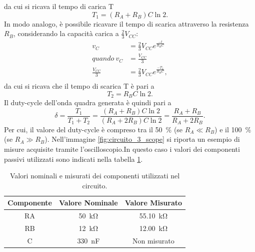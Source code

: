 da cui si ricava il tempo di carica T
\begin{equation}
	T_{1}=(R_A+R_B)C\ln{2}.
\end{equation}
In modo analogo, è possibile ricavare il tempo di scarica attraverso la resistenza $R_B$, considerando la capacità carica a $\frac{2}{3}V_{CC}$:
\begin{equation}
	\begin{split}
		v_C&=\frac{2}{3}V_{CC}e^{\frac{-t}{R_BC}} \\
		quando \ v_C&=\frac{V_{CC}}{3} \\
		\frac{V_{CC}}{3}&=\frac{2}{3}V_{CC}e^{\frac{-T_2}{R_BC}}, \\
	\end{split}
\end{equation}
da cui si ricava che il tempo di scarica T è pari a
\begin{equation}
	T_2=R_B C \ln{2}.
\end{equation}
Il duty-cycle dell'onda quadra generata è quindi pari a 
\begin{equation}
	\delta=\frac{T_1}{T_1+T_2}=\frac{(R_A+R_B)C\ln{2}}{(R_A+2R_B)C\ln{2}}=\frac{R_A+R_B}{R_A+2R_B}.
	\label{eq:3_1}
\end{equation}
Per cui, il valore del duty-cycle è compreso tra il \SI{50}{\percent} (se $R_A\ll R_B$) e il \SI{100}{\percent} (se $R_A \gg R_B$). 
\noindent
Nell'immagine \ref{fig:circuito_3_scope} si riporta un esempio di misure acquisite tramite l'oscilloscopio.In questo caso i valori dei componenti passivi utilizzati sono indicati nella tabella \ref{tab:valori_componenti_3}.
\def\arraystretch{1.3}
\begin{table}[h!]
	\centering
	\begin{tabular}{|c|c|c|}
		\hline
		Componente	& Valore Nominale & Valore Misurato \\ \hline
		RA &\SI{50}{\kilo\ohm} & \SI{55.10}{\kilo\ohm} \\ \hline
		RB &\SI{12}{\kilo\ohm} & \SI{12.00}{\kilo\ohm} \\ \hline
		C & \SI{330}{\nano\farad} & Non misurato \\ \hline
	\end{tabular}
	\caption{Valori nominali e misurati dei componenti utilizzati nel circuito.}
	\label{tab:valori_componenti_3}
\end{table}
